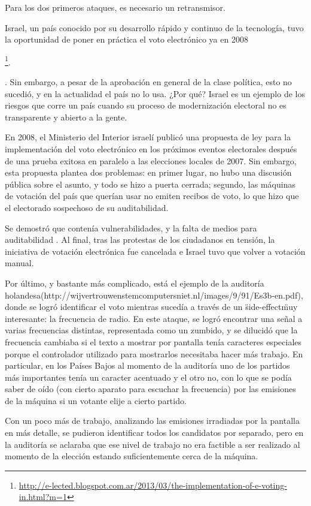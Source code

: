 Para los dos primeros ataques, es necesario un retransmisor.

Israel, un país conocido por su desarrollo rápido y continuo de la tecnología, tuvo la oportunidad de poner en práctica el voto electrónico ya en 2008

\footnote{\url{http://e-lected.blogspot.com.ar/2013/03/the-implementation-of-e-voting-in.html?m=1}}.

. Sin embargo, a pesar de la aprobación en general de la clase política, esto no sucedió, y en la actualidad el país no lo usa. ¿Por qué? Israel es un ejemplo de los riesgos que corre un país cuando su proceso de modernización electoral no es transparente y abierto a la gente.

En 2008, el Ministerio del Interior israelí publicó una propuesta de ley para la implementación del voto electrónico en los próximos eventos electorales después de una prueba exitosa en paralelo a las elecciones locales de 2007. Sin embargo, esta propuesta plantea dos problemas: en primer lugar, no hubo una discusión pública sobre el asunto, y todo se hizo a puerta cerrada; segundo, las máquinas de votación del país que querían usar no emiten recibos de voto, lo que hizo que el electorado sospechoso de su auditabilidad.

Se demostró que contenía vulnerabilidades, y la falta de medios para auditabilidad .
Al final, tras las protestas de los ciudadanos en tensión, la iniciativa de votación electrónica fue cancelada e Israel tuvo que volver a votación manual.


Por último, y bastante más complicado, está el ejemplo de la auditoría holandesa(http://wijvertrouwenstemcomputersniet.nl/images/9/91/Es3b-en.pdf), donde se logró identificar el voto mientras sucedía a través de un \"side-effect\" muy interesante: la frecuencia de radio. En este ataque, se logró encontrar una señal a varias frecuencias distintas, representada como un zumbido, y se dilucidó que la frecuencia cambiaba si el texto a mostrar por pantalla tenía caracteres especiales porque el controlador utilizado para mostrarlos necesitaba hacer más trabajo. En particular, en los Países Bajos al momento de la auditoría uno de los partidos más importantes tenía un caracter acentuado y el otro no, con lo que se podía saber de oído (con cierto aparato para escuchar la frecuencia) por las emisiones de la máquina si un votante elije a cierto partido.

Con un poco más de trabajo, analizando las emisiones irradiadas por la pantalla en más detalle, se pudieron identificar todos los candidatos por separado, pero en la auditoría se aclaraba que ese nivel de trabajo no era factible a ser realizado al momento de la elección estando suficientemente cerca de la máquina.
